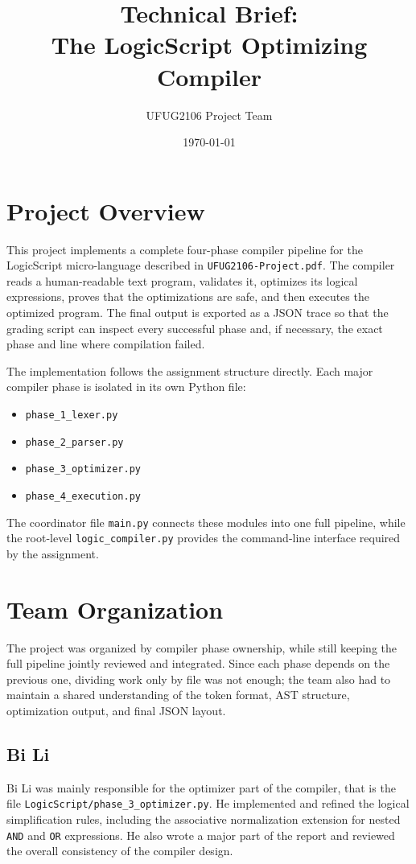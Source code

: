\documentclass[11pt]{article}
\title{Technical Brief:\\The LogicScript Optimizing Compiler}
\author{UFUG2106 Project Team}
\date{\today}
\begin{document}
\maketitle

\section{Project Overview}
This project implements a complete four-phase compiler pipeline for the LogicScript micro-language described in \texttt{UFUG2106-Project.pdf}. The compiler reads a human-readable text program, validates it, optimizes its logical expressions, proves that the optimizations are safe, and then executes the optimized program. The final output is exported as a JSON trace so that the grading script can inspect every successful phase and, if necessary, the exact phase and line where compilation failed.

The implementation follows the assignment structure directly. Each major compiler phase is isolated in its own Python file:
\begin{itemize}
    \item \texttt{phase\_1\_lexer.py}
    \item \texttt{phase\_2\_parser.py}
    \item \texttt{phase\_3\_optimizer.py}
    \item \texttt{phase\_4\_execution.py}
\end{itemize}
The coordinator file \texttt{main.py} connects these modules into one full pipeline, while the root-level \texttt{logic\_compiler.py} provides the command-line interface required by the assignment.

\section{Team Organization}
The project was organized by compiler phase ownership, while still keeping the full pipeline jointly reviewed and integrated. Since each phase depends on the previous one, dividing work only by file was not enough; the team also had to maintain a shared understanding of the token format, AST structure, optimization output, and final JSON layout.

\subsection{Bi Li}
Bi Li was mainly responsible for the optimizer part of the compiler, that is the file \texttt{LogicScript/phase\_3\_optimizer.py}. He implemented and refined the logical simplification rules, including the associative normalization extension for nested \texttt{AND} and \texttt{OR} expressions. He also wrote a major part of the report and reviewed the overall consistency of the compiler design.
\end{document}
